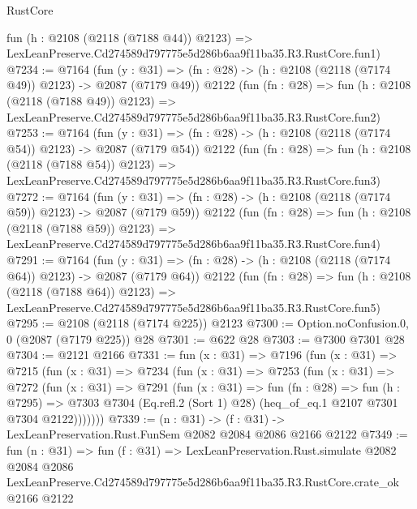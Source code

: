 \begin{lexlean}{RustCore}
\begin{coremodule}
    fun (h : @2108 (@2118 (@7188 @44)) @2123) =>
    LexLeanPreserve.Cd274589d797775e5d286b6aa9f11ba35.R3.RustCore.fun1)
@7234 := @7164
    (fun (y : @31) => (fn : @28) -> (h : @2108 (@2118 (@7174 @49)) @2123) -> @2087 (@7179 @49))
    @2122
    (fun (fn : @28) =>
    fun (h : @2108 (@2118 (@7188 @49)) @2123) =>
    LexLeanPreserve.Cd274589d797775e5d286b6aa9f11ba35.R3.RustCore.fun2)
@7253 := @7164
    (fun (y : @31) => (fn : @28) -> (h : @2108 (@2118 (@7174 @54)) @2123) -> @2087 (@7179 @54))
    @2122
    (fun (fn : @28) =>
    fun (h : @2108 (@2118 (@7188 @54)) @2123) =>
    LexLeanPreserve.Cd274589d797775e5d286b6aa9f11ba35.R3.RustCore.fun3)
@7272 := @7164
    (fun (y : @31) => (fn : @28) -> (h : @2108 (@2118 (@7174 @59)) @2123) -> @2087 (@7179 @59))
    @2122
    (fun (fn : @28) =>
    fun (h : @2108 (@2118 (@7188 @59)) @2123) =>
    LexLeanPreserve.Cd274589d797775e5d286b6aa9f11ba35.R3.RustCore.fun4)
@7291 := @7164
    (fun (y : @31) => (fn : @28) -> (h : @2108 (@2118 (@7174 @64)) @2123) -> @2087 (@7179 @64))
    @2122
    (fun (fn : @28) =>
    fun (h : @2108 (@2118 (@7188 @64)) @2123) =>
    LexLeanPreserve.Cd274589d797775e5d286b6aa9f11ba35.R3.RustCore.fun5)
@7295 := @2108 (@2118 (@7174 @225)) @2123
@7300 := Option.noConfusion.{0, 0} (@2087 (@7179 @225)) @28
@7301 := @622 @28
@7303 := @7300 @7301 @28
@7304 := @2121 @2166
@7331 := fun (x : @31) =>
  @7196
    (fun (x : @31) =>
    @7215
      (fun (x : @31) =>
      @7234
        (fun (x : @31) =>
        @7253
          (fun (x : @31) =>
          @7272
            (fun (x : @31) =>
            @7291
              (fun (x : @31) =>
              fun (fn : @28) =>
              fun (h : @7295) =>
              @7303 @7304 (Eq.refl.{2} (Sort 1) @28) (heq_of_eq.{1} @2107 @7301 @7304 @2122)))))))
@7339 := (n : @31) -> (f : @31) -> LexLeanPreservation.Rust.FunSem @2082 @2084 @2086 @2166 @2122
@7349 := fun (n : @31) =>
  fun (f : @31) =>
  LexLeanPreservation.Rust.simulate
    @2082
    @2084
    @2086
    LexLeanPreserve.Cd274589d797775e5d286b6aa9f11ba35.R3.RustCore.crate_ok
    @2166
    @2122
\end{coremodule}
\end{lexlean}
